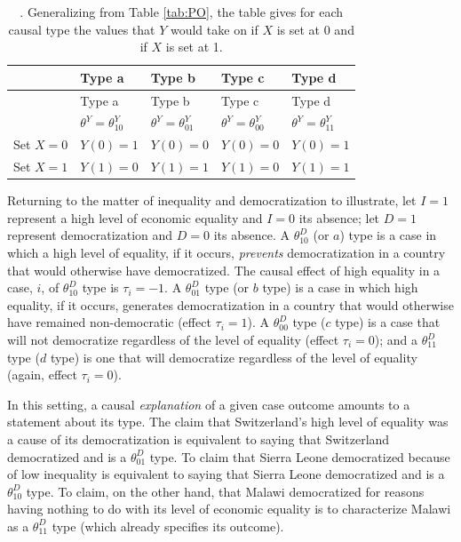 \documentclass[
  12pt,
]{book}
\begin{document}
\begin{longtable}[]{@{}
  >{\raggedright\arraybackslash}p{}
  >{\centering\arraybackslash}p{}
  >{\centering\arraybackslash}p{}
  >{\centering\arraybackslash}p{}
  >{\centering\arraybackslash}p{}@{}}
\caption{\label{tab:POGEN}. Generalizing from Table \ref{tab:PO}, the table gives for each causal type the values that \(Y\) would take on if \(X\) is set at \(0\) and if \(X\) is set at 1.}\tabularnewline
\toprule
\small & Type a & Type b & Type c & Type d \\
\midrule
\endfirsthead
\toprule
\small & Type a & Type b & Type c & Type d \\
\midrule
\endhead
& \(\theta^Y=\theta^Y_{10}\) & \(\theta^Y=\theta^Y_{01}\) & \(\theta^Y=\theta^Y_{00}\) & \(\theta^Y=\theta^Y_{11}\) \\
Set \(X=0\) & \(Y(0)=1\) & \(Y(0)=0\) & \(Y(0)=0\) & \(Y(0)=1\) \\
Set \(X=1\) & \(Y(1)=0\) & \(Y(1)=1\) & \(Y(1)=0\) & \(Y(1)=1\) \\
\bottomrule
\end{longtable}

Returning to the matter of inequality and democratization to illustrate, let \(I=1\) represent a high level of economic equality and \(I=0\) its absence; let \(D=1\) represent democratization and \(D=0\) its absence. A \(\theta^D_{10}\) (or \(a\)) type is a case in which a high level of equality, if it occurs, \emph{prevents} democratization in a country that would otherwise have democratized. The causal effect of high equality in a case, \(i\), of \(\theta^D_{10}\) type is \(\tau_i= -1\). A \(\theta^D_{01}\) type (or \(b\) type) is a case in which high equality, if it occurs, generates democratization in a country that would otherwise have remained non-democratic (effect \(\tau_i= 1\)). A \(\theta^D_{00}\) type (\(c\) type) is a case that will not democratize regardless of the level of equality (effect \(\tau_i = 0\)); and a \(\theta^D_{11}\) type (\(d\) type) is one that will democratize regardless of the level of equality (again, effect \(\tau_i= 0\)).

In this setting, a causal \emph{explanation} of a given case outcome amounts to a statement about its type. The claim that Switzerland's high level of equality was a cause of its democratization is equivalent to saying that Switzerland democratized and is a \(\theta^D_{01}\) type. To claim that Sierra Leone democratized because of low inequality is equivalent to saying that Sierra Leone democratized and is a \(\theta^D_{10}\) type. To claim, on the other hand, that Malawi democratized for reasons having nothing to do with its level of economic equality is to characterize Malawi as a \(\theta^D_{11}\) type (which already specifies its outcome).
\end{document}
